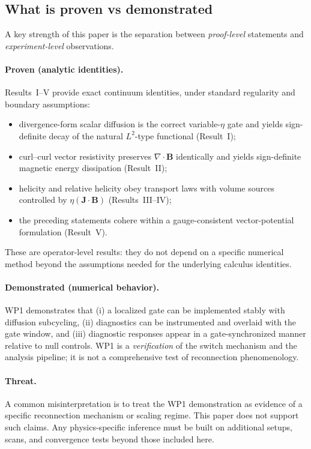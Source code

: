 \documentclass[11pt]{article}
\theoremstyle{plain}
\theoremstyle{definition}
\theoremstyle{remark}
\newcommand{\diver}{\nabla\cdot}
\newcommand{\B}{\mathbf{B}}
\newcommand{\J}{\mathbf{J}}
\begin{document}
\subsection{What is proven vs demonstrated}\label{sec:limitations_proven_demo}
A key strength of this paper is the separation between \emph{proof-level} statements and
\emph{experiment-level} observations.

\paragraph{Proven (analytic identities).}
Results~I--V provide exact continuum identities, under standard regularity and boundary assumptions:
\begin{itemize}[leftmargin=*]
  \item divergence-form scalar diffusion is the correct variable-$\eta$ gate and yields sign-definite
  decay of the natural $L^2$-type functional (Result~I);
  \item curl--curl vector resistivity preserves $\diver\B$ identically and yields sign-definite magnetic
  energy dissipation (Result~II);
  \item helicity and relative helicity obey transport laws with volume sources controlled by
  $\eta(\J\cdot\B)$ (Results~III--IV);
  \item the preceding statements cohere within a gauge-consistent vector-potential formulation (Result~V).
\end{itemize}
These are operator-level results: they do not depend on a specific numerical method beyond the
assumptions needed for the underlying calculus identities.

\paragraph{Demonstrated (numerical behavior).}
WP1 demonstrates that (i) a localized gate can be implemented stably with diffusion subcycling,
(ii) diagnostics can be instrumented and overlaid with the gate window, and (iii) diagnostic responses
appear in a gate-synchronized manner relative to null controls. WP1 is a \emph{verification} of the
switch mechanism and the analysis pipeline; it is not a comprehensive test of reconnection
phenomenology.

\paragraph{Threat.}
A common misinterpretation is to treat the WP1 demonstration as evidence of a specific reconnection
mechanism or scaling regime. This paper does not support such claims. Any physics-specific inference must
be built on additional setups, scans, and convergence tests beyond those included here.
\end{document}
